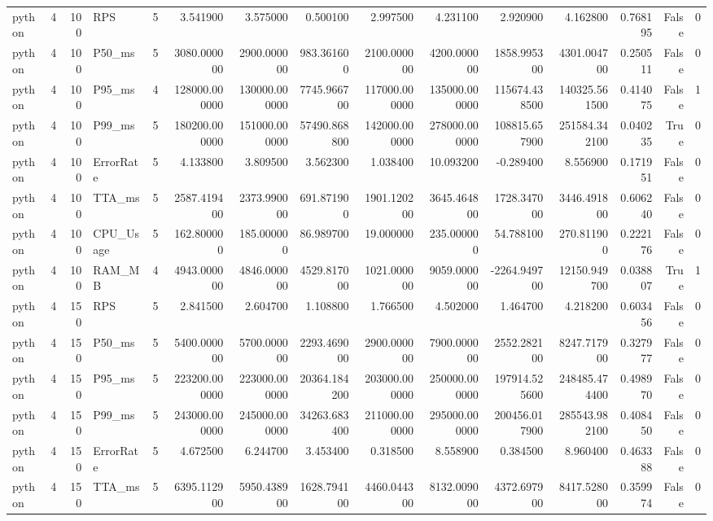 \begin{tabular}{lrrlrrrrrrrrrrr}
python & 4 & 100 & RPS & 5 & 3.541900 & 3.575000 & 0.500100 & 2.997500 & 4.231100 & 2.920900 & 4.162800 & 0.768195 & False & 0 \\
python & 4 & 100 & P50_ms & 5 & 3080.000000 & 2900.000000 & 983.361600 & 2100.000000 & 4200.000000 & 1858.995300 & 4301.004700 & 0.250511 & False & 0 \\
python & 4 & 100 & P95_ms & 4 & 128000.000000 & 130000.000000 & 7745.966700 & 117000.000000 & 135000.000000 & 115674.438500 & 140325.561500 & 0.414075 & False & 1 \\
python & 4 & 100 & P99_ms & 5 & 180200.000000 & 151000.000000 & 57490.868800 & 142000.000000 & 278000.000000 & 108815.657900 & 251584.342100 & 0.040235 & True & 0 \\
python & 4 & 100 & ErrorRate & 5 & 4.133800 & 3.809500 & 3.562300 & 1.038400 & 10.093200 & -0.289400 & 8.556900 & 0.171951 & False & 0 \\
python & 4 & 100 & TTA_ms & 5 & 2587.419400 & 2373.990000 & 691.871900 & 1901.120200 & 3645.464800 & 1728.347000 & 3446.491800 & 0.606240 & False & 0 \\
python & 4 & 100 & CPU_Usage & 5 & 162.800000 & 185.000000 & 86.989700 & 19.000000 & 235.000000 & 54.788100 & 270.811900 & 0.222176 & False & 0 \\
python & 4 & 100 & RAM_MB & 4 & 4943.000000 & 4846.000000 & 4529.817000 & 1021.000000 & 9059.000000 & -2264.949700 & 12150.949700 & 0.038807 & True & 1 \\
python & 4 & 150 & RPS & 5 & 2.841500 & 2.604700 & 1.108800 & 1.766500 & 4.502000 & 1.464700 & 4.218200 & 0.603456 & False & 0 \\
python & 4 & 150 & P50_ms & 5 & 5400.000000 & 5700.000000 & 2293.469000 & 2900.000000 & 7900.000000 & 2552.282100 & 8247.717900 & 0.327977 & False & 0 \\
python & 4 & 150 & P95_ms & 5 & 223200.000000 & 223000.000000 & 20364.184200 & 203000.000000 & 250000.000000 & 197914.525600 & 248485.474400 & 0.498970 & False & 0 \\
python & 4 & 150 & P99_ms & 5 & 243000.000000 & 245000.000000 & 34263.683400 & 211000.000000 & 295000.000000 & 200456.017900 & 285543.982100 & 0.408450 & False & 0 \\
python & 4 & 150 & ErrorRate & 5 & 4.672500 & 6.244700 & 3.453400 & 0.318500 & 8.558900 & 0.384500 & 8.960400 & 0.463388 & False & 0 \\
python & 4 & 150 & TTA_ms & 5 & 6395.112900 & 5950.438900 & 1628.794100 & 4460.044300 & 8132.009000 & 4372.697900 & 8417.528000 & 0.359974 & False & 0 \\

\end{tabular}
